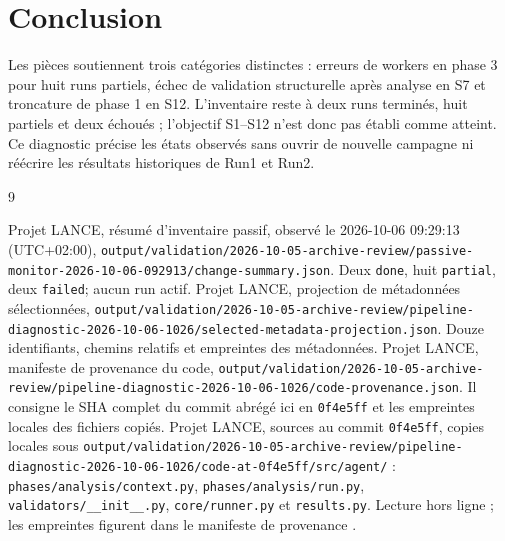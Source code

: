 \documentclass[11pt,a4paper]{article}
\newcommand{\code}[1]{{\urlstyle{tt}\nolinkurl{#1}}}
\begin{document}
\section{Conclusion}
Les pièces soutiennent trois catégories distinctes : erreurs de workers en phase 3 pour huit runs partiels, échec de validation structurelle après analyse en S7 et troncature de phase 1 en S12. L'inventaire reste à deux runs terminés, huit partiels et deux échoués ; l'objectif S1–S12 n'est donc pas établi comme atteint. Ce diagnostic précise les états observés sans ouvrir de nouvelle campagne ni réécrire les résultats historiques de Run1 et Run2.
\small
\setlength{\parskip}{1pt}
\begin{thebibliography}{9}
\setlength{\itemsep}{0pt}
 Projet LANCE, résumé d'inventaire passif, observé le 2026-10-06 09:29:13 (UTC+02:00), \code{output/validation/2026-10-05-archive-review/passive-monitor-2026-10-06-092913/change-summary.json}. Deux \code{done}, huit \code{partial}, deux \code{failed}; aucun run actif.
 Projet LANCE, projection de métadonnées sélectionnées, \code{output/validation/2026-10-05-archive-review/pipeline-diagnostic-2026-10-06-1026/selected-metadata-projection.json}. Douze identifiants, chemins relatifs et empreintes des métadonnées.
 Projet LANCE, manifeste de provenance du code, \code{output/validation/2026-10-05-archive-review/pipeline-diagnostic-2026-10-06-1026/code-provenance.json}. Il consigne le SHA complet du commit abrégé ici en \code{0f4e5ff} et les empreintes locales des fichiers copiés.
 Projet LANCE, sources au commit \code{0f4e5ff}, copies locales sous \code{output/validation/2026-10-05-archive-review/pipeline-diagnostic-2026-10-06-1026/code-at-0f4e5ff/src/agent/} : \code{phases/analysis/context.py}, \code{phases/analysis/run.py}, \code{validators/__init__.py}, \code{core/runner.py} et \code{results.py}. Lecture hors ligne ; les empreintes figurent dans le manifeste de provenance \cite{provenance}.
\end{thebibliography}
\normalsize
\end{document}
